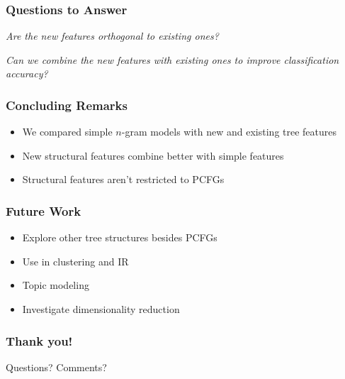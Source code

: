 \documentclass[handouti]{beamer}
\begin{document}


\begin{frame}
    \frametitle{Questions to Answer}
    \emph{Are the new features orthogonal to existing ones?}

    \vspace{.5in}
    \emph{Can we combine the new features with existing ones to improve
    classification accuracy?}
\end{frame}

\begin{frame}
    \frametitle{Concluding Remarks}
        \begin{itemize}
        \itemsep1.5em
        \item We compared simple $n$-gram models with new and existing tree
            features
        \item New structural features combine better with simple features
        \item Structural features aren't restricted to PCFGs 
    \end{itemize}
\end{frame}

\begin{frame}
    \frametitle{Future Work}
    \begin{itemize}
        \itemsep1.5em
        \item Explore other tree structures besides PCFGs
        \item Use in clustering and IR
        \item Topic modeling
        \item Investigate dimensionality reduction
    \end{itemize}
\end{frame}

\begin{frame}
    \frametitle{Thank you!}
    \begin{center}
    Questions? Comments?
    \end{center}
\end{frame}
\end{document}
